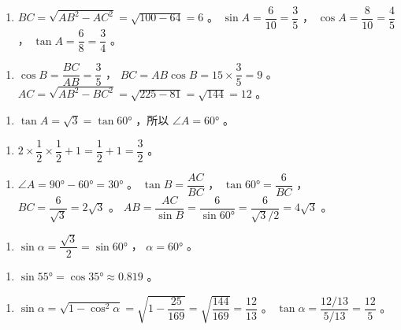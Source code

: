 \begin{answer}


\begin{enumerate}
  \item $BC = \sqrt{AB^2 - AC^2} = \sqrt{100 - 64} = 6$ 。 $\sin A = \dfrac{6}{10} = \dfrac{3}{5}$ ， $\cos A = \dfrac{8}{10} = \dfrac{4}{5}$ ， $\tan A = \dfrac{6}{8} = \dfrac{3}{4}$ 。
\end{enumerate}


\begin{enumerate}
  \item $\cos B = \dfrac{BC}{AB} = \dfrac{3}{5}$ ， $BC = AB \cos B = 15 \times \dfrac{3}{5} = 9$ 。 $AC = \sqrt{AB^2 - BC^2} = \sqrt{225 - 81} = \sqrt{144} = 12$ 。
\end{enumerate}


\begin{enumerate}
  \item $\tan A = \sqrt{3} = \tan 60°$ ，所以 $\angle A = 60°$ 。
\end{enumerate}


\begin{enumerate}
  \item $2 \times \dfrac{1}{2} \times \dfrac{1}{2} + 1 = \dfrac{1}{2} + 1 = \dfrac{3}{2}$ 。
\end{enumerate}


\begin{enumerate}
  \item $\angle A = 90° - 60° = 30°$ 。 $\tan B = \dfrac{AC}{BC}$ ， $\tan 60° = \dfrac{6}{BC}$ ， $BC = \dfrac{6}{\sqrt{3}} = 2\sqrt{3}$ 。 $AB = \dfrac{AC}{\sin B} = \dfrac{6}{\sin 60°} = \dfrac{6}{\sqrt{3}/2} = 4\sqrt{3}$ 。
\end{enumerate}


\begin{enumerate}
  \item $\sin \alpha = \dfrac{\sqrt{3}}{2} = \sin 60°$ ， $\alpha = 60°$ 。
\end{enumerate}


\begin{enumerate}
  \item $\sin 55° = \cos 35° \approx 0.819$ 。
\end{enumerate}


\begin{enumerate}
  \item $\sin \alpha = \sqrt{1 - \cos^2 \alpha} = \sqrt{1 - \dfrac{25}{169}} = \sqrt{\dfrac{144}{169}} = \dfrac{12}{13}$ 。 $\tan \alpha = \dfrac{12/13}{5/13} = \dfrac{12}{5}$ 。
\end{enumerate}



\end{answer}
